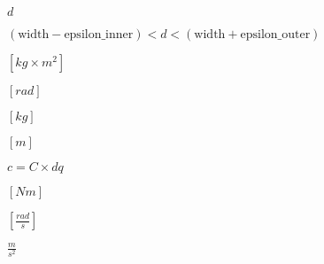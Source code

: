 \documentclass{article}
\begin{document}
$d$
\pagebreak

$(\text{width} - \text{epsilon_inner}) < d < (\text{width} + \text{epsilon_outer})$
\pagebreak

$[kg \times m^2]$
\pagebreak

$[rad]$
\pagebreak

$[kg]$
\pagebreak

$[m]$
\pagebreak

$ c= C \times dq$
\pagebreak

$[Nm]$
\pagebreak

$[\frac{rad}{s}]$
\pagebreak

$\frac{m}{s^2}$
\pagebreak
\end{document}
